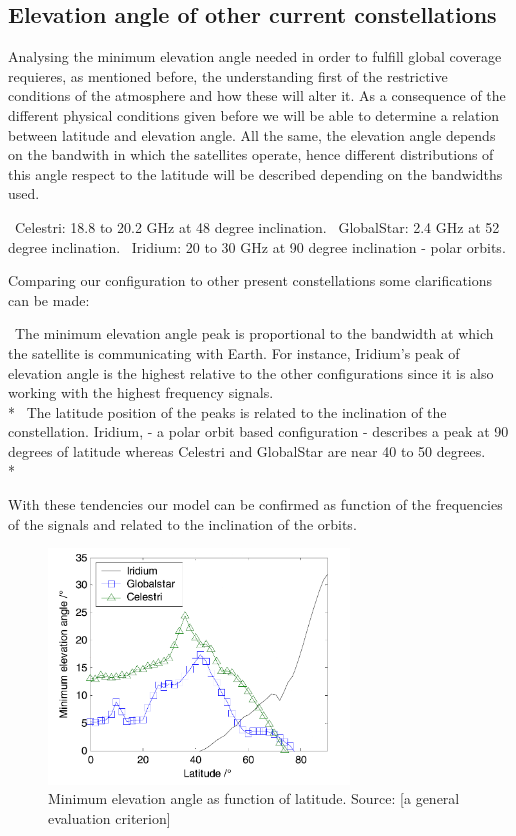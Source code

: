\subsection{Elevation angle of other current constellations}

Analysing the minimum elevation angle needed in order to fulfill global coverage requieres, as mentioned before, the understanding first of the restrictive conditions of the atmosphere and how these will alter it. As a consequence of the different physical conditions given before we will be able to determine a relation between latitude and elevation angle. All the same, the elevation angle depends on the bandwith in which the satellites operate, hence different distributions of this angle respect to the latitude will be described depending on the bandwidths used. 

\textendash\ Celestri: 18.8 to 20.2 GHz at 48 degree inclination.
\textendash\ GlobalStar: 2.4 GHz at 52 degree inclination.
\textendash\ Iridium: 20 to 30 GHz at 90 degree inclination - polar orbits.

Comparing our configuration to other present constellations some clarifications can be made: 

\textendash\ The minimum elevation angle peak is proportional to the bandwidth at which the satellite is communicating with Earth. For instance, Iridium's peak of elevation angle is the highest relative to the other configurations since it is also working with the highest frequency signals. \\*
\textendash\ The latitude position of the peaks is related to the inclination of the constellation. Iridium, - a polar orbit based configuration - describes a peak at 90 degrees of latitude whereas Celestri and GlobalStar are near 40 to 50 degrees. \\*

With these tendencies our model can be confirmed as function of the frequencies of the signals and related to the inclination of the orbits. 

\begin{figure}[h]
\includegraphics[width=8cm]{latitudes}
\centering
\caption[Minimum elevation angle as function of latitude.]{Minimum elevation angle as function of latitude. Source: [a general evaluation criterion]}
\end{figure}